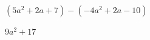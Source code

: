 
\question $(5a^2 + 2a + 7) - (-4a^2 + 2a - 10)$

  \begin{solutionorlines}[2cm]
    $9a^2 + 17$
  \end{solutionorlines}

